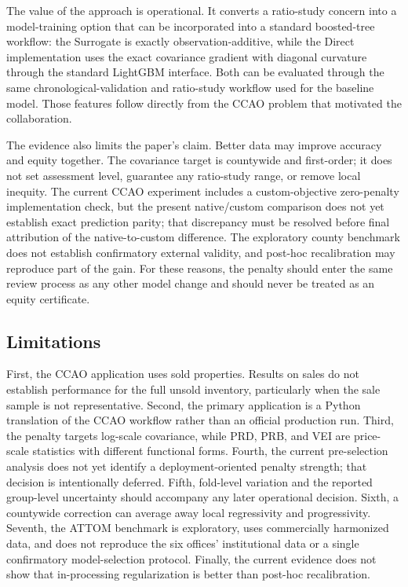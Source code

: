 \documentclass[10pt]{article}
\theoremstyle{definition}
\newcommand{\1}{\mathbf{1}}
\newcommand{\advisorchange}[1]{{\color{blue}#1}}
\newcommand{\oldtext}[1]{\textcolor{blue}{\sout{#1}}}
\newcommand{\newtext}[1]{\textcolor{impGreen}{#1}}
\begin{document}
\newtext{The value of the approach is operational. It converts a ratio-study concern into a model-training option that can be incorporated into a standard boosted-tree workflow: the Surrogate is exactly observation-additive, while the Direct implementation uses the exact covariance gradient with diagonal curvature through the standard LightGBM interface. Both can be evaluated through the same chronological-validation and ratio-study workflow used for the baseline model.} \advisorchange{Those features follow directly from the CCAO problem that motivated the collaboration.}

The evidence also limits the paper's claim. Better data may improve accuracy and equity together. The covariance target is countywide and first-order; it does not set assessment level, guarantee any ratio-study range, or remove local inequity. The current CCAO experiment includes a custom-objective zero-penalty implementation check, but the present native/custom comparison does not yet establish exact prediction parity; that discrepancy must be resolved before final attribution of the native-to-custom difference. The exploratory county benchmark does not establish confirmatory external validity, and post-hoc recalibration may reproduce part of the gain. For these reasons, the penalty should enter the same review process as any other model change and should never be treated as an equity certificate.

\subsection{Limitations}

\advisorchange{First, the CCAO application uses sold properties.} Results on sales do not establish performance for the full unsold inventory, particularly when the sale sample is not representative. \advisorchange{Second, the primary application is a Python translation} of the CCAO workflow rather than an official production run. Third, the penalty targets log-scale covariance, while PRD, PRB, and VEI are price-scale statistics with different functional forms. Fourth, the current pre-selection analysis does not yet identify a deployment-oriented penalty strength; that decision is intentionally deferred. Fifth, fold-level variation and the reported group-level uncertainty should accompany any later operational decision. Sixth, a countywide correction can average away local regressivity and progressivity. Seventh, the ATTOM benchmark is exploratory, uses commercially harmonized data, and does not reproduce the six offices' institutional data or a single confirmatory model-selection protocol. Finally, the current evidence does not show that in-processing regularization is better than post-hoc recalibration.
\end{document}
